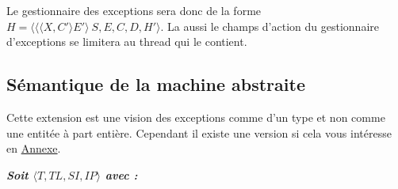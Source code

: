 \documentclass[10pt,a4paper]{report}
\begin{document}
	Le gestionnaire des exceptions sera donc de la forme $H = \langle \langle\langle X,C'\rangle E'\rangle~S,E,C,D,H'\rangle$. La aussi le champs d'action du gestionnaire d'exceptions se limitera au thread qui le contient.
	\newpage 
	
	
	
	\subsection{Sémantique de la machine abstraite}
	
	Cette extension est une vision des exceptions comme d'un type et non comme une entitée à part entière. Cependant il existe une version si cela vous intéresse en \hyperref[TTSI1]{Annexe}.
	\bigbreak
	
	
	\textbf{\textit{Soit $\langle T,TL,SI,IP\rangle$ avec :}}
	
\end{document}
